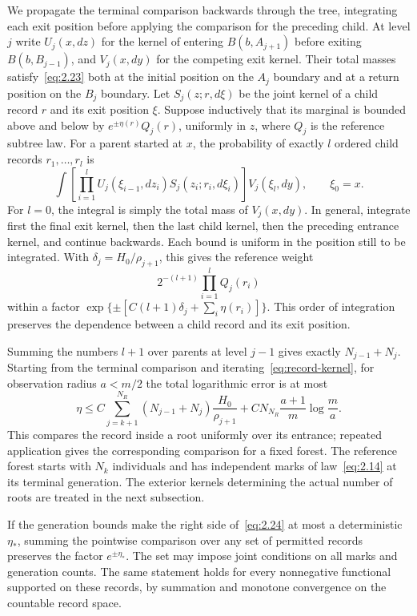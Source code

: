 \documentclass[11pt,letterpaper,reqno]{amsart}
\numberwithin{equation}{section}
\theoremstyle{remark}
\begin{document}
We propagate the terminal comparison backwards through the tree, integrating each exit position before applying the comparison for the preceding child. At level $j$ write $U_j(x,dz)$ for the kernel of entering $B(b,A_{j+1})$ before exiting $B(b,B_{j-1})$, and $V_j(x,dy)$ for the competing exit kernel. Their total masses satisfy~\eqref{eq:2.23} both at the initial position on the $A_j$ boundary and at a return position on the $B_j$ boundary. Let $S_j(z;r,d\xi)$ be the joint kernel of a child record $r$ and its exit position $\xi$. Suppose inductively that its marginal is bounded above and below by $e^{\pm\eta(r)}Q_j(r)$, uniformly in $z$, where $Q_j$ is the reference subtree law. For a parent started at $x$, the probability of exactly $l$ ordered child records $r_1,\ldots,r_l$ is
\begin{equation}\label{eq:record-kernel}
\int\left[\prod_{i=1}^l
U_j(\xi_{i-1},dz_i)S_j(z_i;r_i,d\xi_i)\right]
V_j(\xi_l,dy),\qquad \xi_0=x.
\end{equation}
For $l=0$, the integral is simply the total mass of $V_j(x,dy)$. In general, integrate first the final exit kernel, then the last child kernel, then the preceding entrance kernel, and continue backwards. Each bound is uniform in the position still to be integrated. With $\delta_j=H_0/\rho_{j+1}$, this gives the reference weight
\[
2^{-(l+1)}\prod_{i=1}^lQ_j(r_i)
\]
within a factor $\exp\{\pm[C(l+1)\delta_j+\sum_i\eta(r_i)]\}$. This order of integration preserves the dependence between a child record and its exit position.

Summing the numbers $l+1$ over parents at level $j-1$ gives exactly $N_{j-1}+N_j$. Starting from the terminal comparison and iterating~\eqref{eq:record-kernel}, for observation radius $a<m/2$ the total logarithmic error is at most
\begin{equation}\label{eq:2.24}
\eta\le
C\sum_{j=k+1}^{N_R}(N_{j-1}+N_j)\frac{H_0}{\rho_{j+1}}
+CN_{N_R}\frac{a+1}{m}\log\frac ma.
\end{equation}
This compares the record inside a root uniformly over its entrance; repeated application gives the corresponding comparison for a fixed forest. The reference forest starts with $N_k$ individuals and has independent marks of law~\eqref{eq:2.14} at its terminal generation. The exterior kernels determining the actual number of roots are treated in the next subsection.

If the generation bounds make the right side of~\eqref{eq:2.24} at most a deterministic $\eta_*$, summing the pointwise comparison over any set of permitted records preserves the factor $e^{\pm\eta_*}$. The set may impose joint conditions on all marks and generation counts. The same statement holds for every nonnegative functional supported on these records, by summation and monotone convergence on the countable record space.
\end{document}

